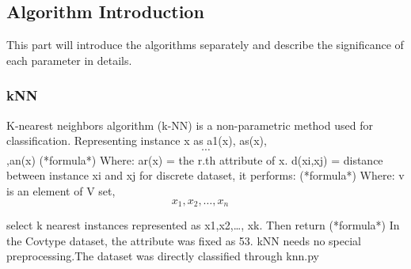 \documentclass[12pt]{report}
\begin{document}
\subsection*{Algorithm Introduction}
This part will introduce the algorithms separately and describe the significance of each parameter in details.

\subsubsection*{kNN}
K-nearest neighbors algorithm (k-NN) is a non-parametric method used for classification. Representing instance x as a1(x), as(x),\[\cdots\],an(x)
\newline(*formula*)
\newline Where:
\newline ar(x) = the r.th attribute of x. 
\newline d(xi,xj) = distance between instance xi and xj
\newline for discrete dataset, it performs:
\newline (*formula*)
\newline Where:
\newline v is an element of V set,    
\newline \[ x_1,x_2,\dots ,x_n\quad\]



\newline select k nearest instances represented as x1,x2,…, xk. Then return
\newline (*formula*)
\newline
\newline
In the Covtype dataset, the attribute was fixed as 53.
\newline kNN needs no special preprocessing.The dataset was directly classified through knn.py
\end{document}
